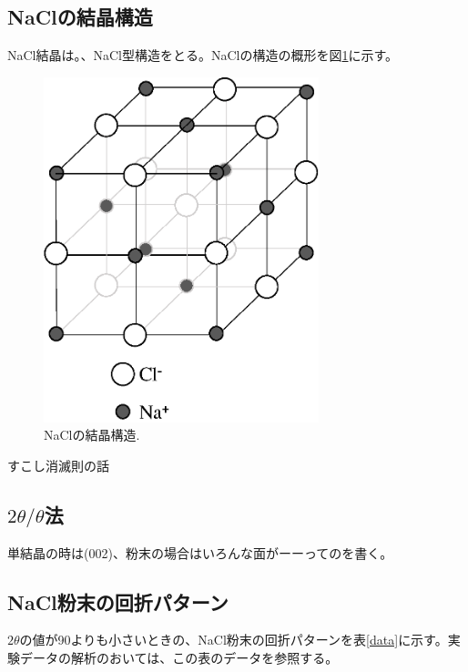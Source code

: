 \documentclass[11pt,a4j,uplatex]{jsarticle}
\begin{document}
\newpage
\subsection{NaClの結晶構造}
NaCl結晶は。、NaCl型構造をとる。NaClの構造の概形を図\ref{nacl}に示す。

\begin{figure}[htb]
 \centering
 \includegraphics[clip,width=8cm]{nacl.eps}
 \caption{NaClの結晶構造.}
 \label{nacl}
\end{figure}

すこし消滅則の話

\newpage
\subsection{$2\theta/\theta$法}

単結晶の時は(002)、粉末の場合はいろんな面がーーってのを書く。

\newpage
\subsection{NaCl粉末の回折パターン}

$2\theta$の値が90よりも小さいときの、NaCl粉末の回折パターンを表\ref{data}に示す。実験データの解析のおいては、この表のデータを参照する。
\end{document}
